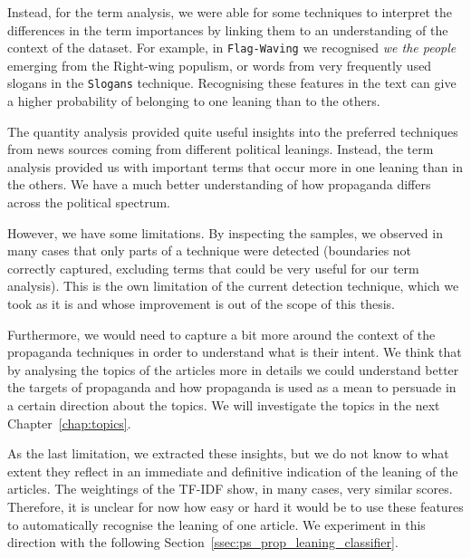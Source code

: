 Instead, for the term analysis, we were able for some techniques to interpret the differences in the term importances by linking them to an understanding of the context of the dataset. For example, in \texttt{Flag-Waving} we recognised \textit{we the people} emerging from the Right-wing populism, or words from very frequently used slogans in the \texttt{Slogans} technique.
Recognising these features in the text can give a higher probability of belonging to one leaning than to the others.

The quantity analysis provided quite useful insights into the preferred techniques from news sources coming from different political leanings. Instead, the term analysis provided us with important terms that occur more in one leaning than in the others.
We have a much better understanding of how propaganda differs across the political spectrum.

However, we have some limitations. By inspecting the samples, we observed in many cases that only parts of a technique were detected (boundaries not correctly captured, excluding terms that could be very useful for our term analysis).
This is the own limitation of the current detection technique, which we took as it is and whose improvement is out of the scope of this thesis.

Furthermore, we would need to capture a bit more around the context of the propaganda techniques in order to understand what is their intent. We think that by analysing the topics of the articles more in details we could understand better the targets of propaganda and how propaganda is used as a mean to persuade in a certain direction about the topics. We will investigate the topics in the next Chapter~\ref{chap:topics}.

As the last limitation, we extracted these insights, but we do not know to what extent they reflect in an immediate and definitive indication of the leaning of the articles.
The weightings of the TF-IDF show, in many cases, very similar scores. Therefore, it is unclear for now how easy or hard it would be to use these features to automatically recognise the leaning of one article. %
We experiment in this direction with the following Section~\ref{ssec:ps_prop_leaning_classifier}.


